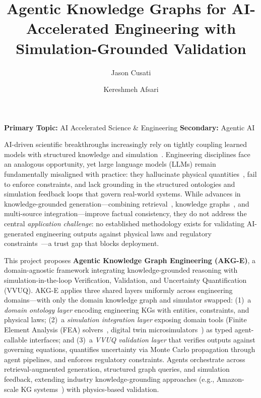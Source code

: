 \documentclass[conference, 10pt]{IEEEtran}
\title{Agentic Knowledge Graphs for AI-Accelerated Engineering with Simulation-Grounded Validation}
\author{Jason Cusati \and Kereshmeh Afsari}
\date{}
\begin{document}
\maketitle
\thispagestyle{empty}

\vspace{-1.5em}

\noindent\textbf{Primary Topic:} AI Accelerated Science \& Engineering \hfill
\textbf{Secondary:} Agentic AI

\vspace{0.5em}

AI-driven scientific breakthroughs increasingly rely on tightly coupling learned models with structured knowledge and simulation~\cite{Abramson2024AlphaFold3,Merchant2023GNoME}. Engineering disciplines face an analogous opportunity, yet large language models (LLMs) remain fundamentally misaligned with practice: they hallucinate physical quantities~\cite{Ji2023HallucinationSurvey}, fail to enforce constraints, and lack grounding in the structured ontologies and simulation feedback loops that govern real-world systems. While advances in knowledge-grounded generation---combining retrieval~\cite{Lewis2020RAG}, knowledge graphs~\cite{Edge2024GraphRAG}, and multi-source integration---improve factual consistency, they do not address the central \textit{application challenge}: no established methodology exists for validating AI-generated engineering outputs against physical laws and regulatory constraints~\cite{Oberkampf2010VVUQ}---a trust gap that blocks deployment.

This project proposes \textbf{Agentic Knowledge Graph Engineering (AKG-E)}, a domain-agnostic framework integrating knowledge-grounded reasoning with simulation-in-the-loop Verification, Validation, and Uncertainty Quantification (VVUQ). AKG-E applies three shared layers uniformly across engineering domains---with only the domain knowledge graph and simulator swapped: (1)~a \textit{domain ontology layer} encoding engineering KGs with entities, constraints, and physical laws; (2)~a \textit{simulation integration layer} exposing domain tools (Finite Element Analysis (FEA) solvers~\cite{Logg2012FEniCS}, digital twin microsimulators~\cite{Tao2019DigitalTwin}) as typed agent-callable interfaces; and (3)~a \textit{VVUQ validation layer} that verifies outputs against governing equations, quantifies uncertainty via Monte Carlo propagation through agent pipelines, and enforces regulatory constraints. Agents orchestrate across retrieval-augmented generation, structured graph queries, and simulation feedback, extending industry knowledge-grounding approaches (e.g., Amazon-scale KG systems~\cite{Yu2024COSMO}) with physics-based validation.
\end{document}
